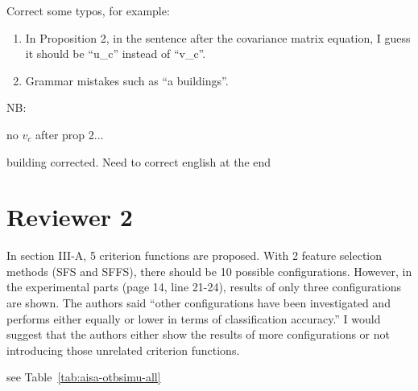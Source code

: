 \documentclass[a4paper,10pt,DIV=16]{scrartcl}
\begin{document}
\begin{revbox}
  Correct some typos, for example:
  \begin{enumerate}
    \item In Proposition 2, in the sentence after the covariance matrix equation, I guess it should be ``u\_c'' instead of ``v\_c''.
    \item Grammar mistakes such as ``a buildings''.
  \end{enumerate}
  \begin{resbox}
    NB:

    no $v_c$ after prop 2...

    building corrected. Need to correct english at the end
  \end{resbox}
\end{revbox}

\section{Reviewer 2}
\begin{revbox}
  In section III-A, 5 criterion functions are proposed. With 2 feature selection methods (SFS and SFFS), there should be 10 possible configurations. However, in the experimental parts (page 14, line 21-24), results of only three configurations are shown. The authors said “other configurations have been investigated and performs either equally or lower in terms of classification accuracy.” I would suggest that the authors either show the results of more configurations or not introducing those unrelated criterion functions.
  \begin{resbox}
    see Table~\ref{tab:aisa-otbsimu-all}
  \end{resbox}
\end{revbox}
\end{document}
